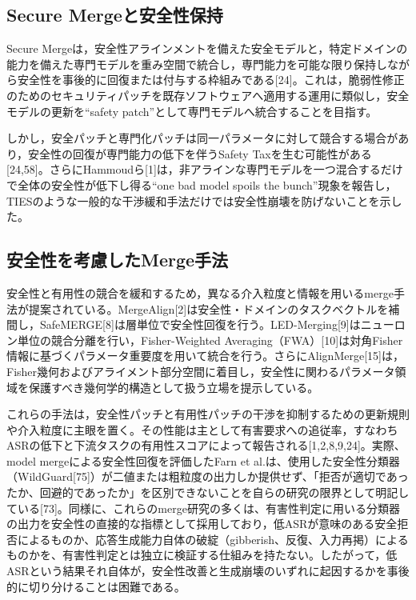 \documentclass{article}
\begin{document}
\subsection{Secure Mergeと安全性保持}
Secure Mergeは，安全性アラインメントを備えた安全モデルと，特定ドメインの能力を備えた専門モデルを重み空間で統合し，専門能力を可能な限り保持しながら安全性を事後的に回復または付与する枠組みである[24]。これは，脆弱性修正のためのセキュリティパッチを既存ソフトウェアへ適用する運用に類似し，安全モデルの更新を``safety patch''として専門モデルへ統合することを目指す。

しかし，安全パッチと専門化パッチは同一パラメータに対して競合する場合があり，安全性の回復が専門能力の低下を伴うSafety Taxを生む可能性がある[24,58]。さらにHammoudら[1]は，非アラインな専門モデルを一つ混合するだけで全体の安全性が低下し得る``one bad model spoils the bunch''現象を報告し，TIESのような一般的な干渉緩和手法だけでは安全性崩壊を防げないことを示した。

\subsection{安全性を考慮したMerge手法}
安全性と有用性の競合を緩和するため，異なる介入粒度と情報を用いるmerge手法が提案されている。MergeAlign[2]は安全性・ドメインのタスクベクトルを補間し，SafeMERGE[8]は層単位で安全性回復を行う。LED-Merging[9]はニューロン単位の競合分離を行い，Fisher-Weighted Averaging（FWA）[10]は対角Fisher情報に基づくパラメータ重要度を用いて統合を行う。さらにAlignMerge[15]は，Fisher幾何およびアライメント部分空間に着目し，安全性に関わるパラメータ領域を保護すべき幾何学的構造として扱う立場を提示している。

これらの手法は，安全性パッチと有用性パッチの干渉を抑制するための更新規則や介入粒度に主眼を置く。その性能は主として有害要求への追従率，すなわちASRの低下と下流タスクの有用性スコアによって報告される[1,2,8,9,24]。実際、model mergeによる安全性回復を評価したFarn et al.は、使用した安全性分類器（WildGuard[75]）が二値または粗粒度の出力しか提供せず、「拒否が適切であったか、回避的であったか」を区別できないことを自らの研究の限界として明記している[73]。同様に、これらのmerge研究の多くは、有害性判定に用いる分類器の出力を安全性の直接的な指標として採用しており，低ASRが意味のある安全拒否によるものか、応答生成能力自体の破綻（gibberish、反復、入力再掲）によるものかを、有害性判定とは独立に検証する仕組みを持たない。したがって，低ASRという結果それ自体が，安全性改善と生成崩壊のいずれに起因するかを事後的に切り分けることは困難である。

\end{document}
